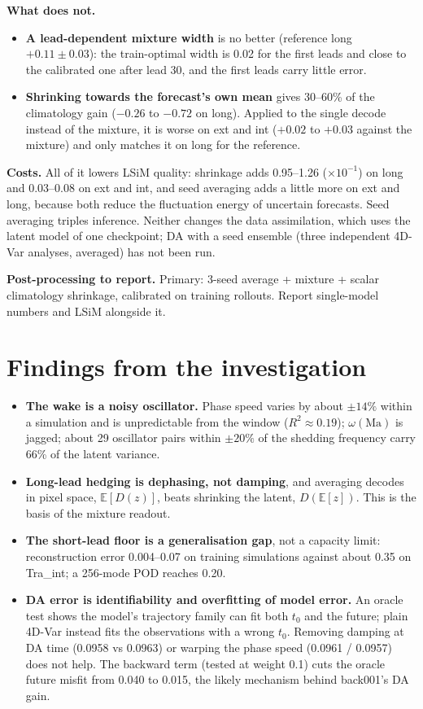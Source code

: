 \documentclass[10.5pt,a4paper]{article}
\newcommand{\callout}[1]{\par\smallskip\noindent\colorbox{note}{\parbox{\dimexpr\linewidth-2\fboxsep}{\small #1}}\par\smallskip}
\begin{document}
\textbf{What does not.}
\begin{itemize}
\item \textbf{A lead-dependent mixture width} is no better (reference long $+0.11\pm0.03$): the
  train-optimal width is 0.02 for the first leads and close to the calibrated one after lead 30,
  and the first leads carry little error.
\item \textbf{Shrinking towards the forecast's own mean} gives 30--60\% of the climatology gain
  ($-0.26$ to $-0.72$ on long). Applied to the single decode instead of the mixture, it is worse
  on ext and int ($+0.02$ to $+0.03$ against the mixture) and only matches it on long for the
  reference.
\end{itemize}

\textbf{Costs.} All of it lowers LSiM quality: shrinkage adds 0.95--1.26 ($\times10^{-1}$) on
long and 0.03--0.08 on ext and int, and seed averaging adds a little more on ext and long, because both reduce the
fluctuation energy of uncertain forecasts. Seed averaging triples inference. Neither changes the
data assimilation, which uses the latent model of one checkpoint; DA with a seed ensemble (three
independent 4D-Var analyses, averaged) has not been run.

\callout{\textbf{Post-processing to report.} Primary: 3-seed average + mixture + scalar
climatology shrinkage, calibrated on training rollouts. Report single-model numbers and LSiM
alongside it.}

\section{Findings from the investigation}\label{sec:findings}
\begin{itemize}
\item \textbf{The wake is a noisy oscillator.} Phase speed varies by about $\pm14\%$ within a
  simulation and is unpredictable from the window ($R^2\approx0.19$); $\omega(\mathrm{Ma})$ is
  jagged; about 29 oscillator pairs within $\pm20\%$ of the shedding frequency carry 66\% of the
  latent variance.
\item \textbf{Long-lead hedging is dephasing, not damping}, and averaging decodes in pixel space,
  $\mathbb E[D(z)]$, beats shrinking the latent, $D(\mathbb E[z])$. This is the basis of the
  mixture readout.
\item \textbf{The short-lead floor is a generalisation gap}, not a capacity limit: reconstruction
  error 0.004--0.07 on training simulations against about 0.35 on Tra\_int; a 256-mode POD
  reaches 0.20.
\item \textbf{DA error is identifiability and overfitting of model error.} An oracle test shows
  the model's trajectory family can fit both $t_0$ and the future; plain 4D-Var instead fits the
  observations with a wrong $t_0$. Removing damping at DA time (0.0958 vs 0.0963) or warping the
  phase speed (0.0961 / 0.0957) does not help. The backward term (tested at weight 0.1) cuts the
  oracle future misfit from 0.040 to 0.015, the likely mechanism behind back001's DA gain.
\end{itemize}
\end{document}
